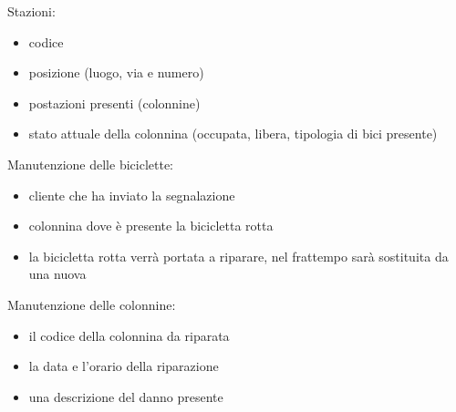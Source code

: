 \documentclass[a4paper,twoside]{article}
\begin{document}
Stazioni:
\begin{itemize}
 \item codice
 \item posizione (luogo, via e numero)
 \item postazioni presenti (colonnine)
 \item stato attuale della colonnina (occupata, libera, tipologia di bici presente)
\end{itemize}
Manutenzione delle biciclette:
\begin{itemize}
 \item cliente che ha inviato la segnalazione
 \item colonnina dove è presente la bicicletta rotta
 \item la bicicletta rotta verrà portata a riparare, nel frattempo sarà sostituita da una nuova
\end{itemize}
Manutenzione delle colonnine:
\begin{itemize}
 \item il codice della colonnina da riparata
 \item la data e l'orario della riparazione
 \item una descrizione del danno presente
\end{itemize}
\end{document}
